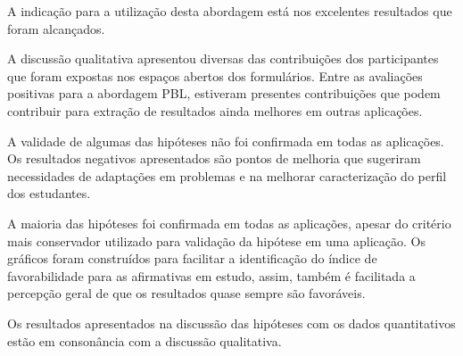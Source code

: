 A indicação para a utilização desta abordagem está
nos excelentes resultados que foram alcançados.

A discussão qualitativa apresentou diversas das contribuições
dos participantes que foram expostas nos espaços abertos dos
formulários.
Entre as avaliações positivas para a abordagem \ac{PBL},
estiveram presentes contribuições que podem contribuir para
extração de resultados ainda melhores em outras aplicações.

A validade de algumas das hipóteses não foi confirmada
em todas as aplicações.
Os resultados negativos apresentados são pontos de
melhoria que sugeriram necessidades de adaptações
em problemas e na melhorar caracterização do perfil
dos estudantes.

A maioria das hipóteses foi confirmada em todas as aplicações,
apesar do critério mais conservador utilizado para validação da
hipótese em uma aplicação.
Os gráficos foram construídos para facilitar a identificação
do índice de favorabilidade para as afirmativas em estudo, assim,
também é facilitada a percepção geral de que os resultados quase
sempre são favoráveis.

Os resultados apresentados na discussão das hipóteses com
os dados quantitativos estão em consonância com a discussão
qualitativa.
